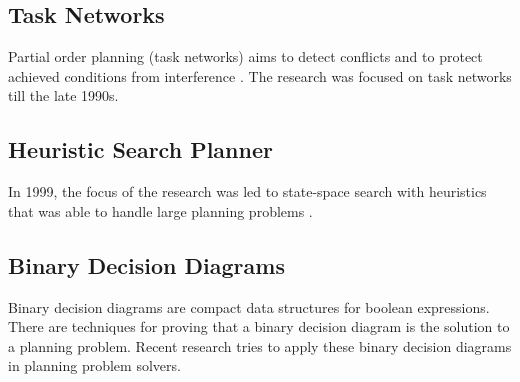 \documentclass[12pt,a4paper,notitlepage]{article}
\begin{document}
\subsection{Task Networks}
Partial order planning (task networks) aims to detect conflicts \cite{tate1975interacting} and to protect achieved conditions from interference \cite{sussman1975computer}. The research was focused on task networks till the late 1990s. 

\subsection{Heuristic Search Planner}
In 1999, the focus of the research was led to state-space search with heuristics that was able to handle large planning problems \cite{bonet1999planning}.

\subsection{Binary Decision Diagrams}
Binary decision diagrams are compact data structures for boolean expressions. There are techniques for proving that a binary decision diagram is the solution to a planning problem. Recent research tries to apply these binary decision diagrams in planning problem solvers. 




\end{document}
